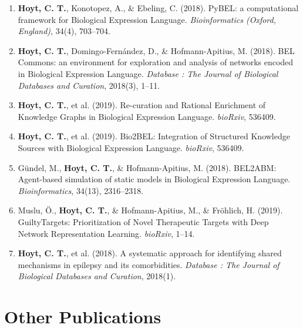 \begin{enumerate}
    \item \textbf{Hoyt, C. T.}, Konotopez, A., \& Ebeling, C. (2018). PyBEL: a computational framework for Biological Expression Language. \textit{Bioinformatics (Oxford, England)}, 34(4), 703–704.
    \item \textbf{Hoyt, C. T.}, Domingo-Fernández, D., \& Hofmann-Apitius, M. (2018). BEL Commons: an environment for exploration and analysis of networks encoded in Biological Expression Language. \textit{Database : The Journal of Biological Databases and Curation}, 2018(3), 1–11.
    \item \textbf{Hoyt, C. T.}, et al. (2019). Re-curation and Rational Enrichment of Knowledge Graphs in Biological Expression Language. \textit{bioRxiv}, 536409.
    \item \textbf{Hoyt, C. T.}, et al. (2019). Bio2BEL: Integration of Structured Knowledge Sources with Biological Expression Language. \textit{bioRxiv}, 536409.
    \item Gündel, M., \textbf{Hoyt, C. T.}, \& Hofmann-Apitius, M. (2018). BEL2ABM: Agent-based simulation of static models in Biological Expression Language. \textit{Bioinformatics}, 34(13), 2316–2318.
    \item Muslu, Ö., \textbf{Hoyt, C. T.}, \& Hofmann-Apitius, M., \& Fröhlich, H. (2019). GuiltyTargets: Prioritization of Novel Therapeutic Targets with Deep Network Representation Learning. \textit{bioRxiv}, 1–14.
    \item \textbf{Hoyt, C. T.}, et al. (2018). A systematic approach for identifying shared mechanisms in epilepsy and its comorbidities. \textit{Database : The Journal of Biological Databases and Curation}, 2018(1).
\end{enumerate}

\section*{Other Publications}

